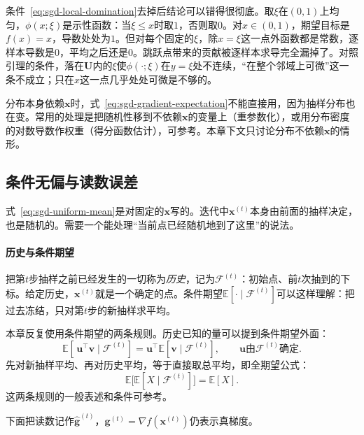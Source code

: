 条件~\eqref{eq:sgd-local-domination}去掉后结论可以错得很彻底。取$\xi$在$(0,1)$上均匀，$\phi(x;\xi)$是示性函数：当$\xi\leq x$时取$1$，否则取$0$。对$x\in(0,1)$，期望目标是$f(x)=x$，导数处处为$1$。但对每个固定的$\xi$，除$x=\xi$这一点外函数都是常数，逐样本导数是$0$，平均之后还是$0$。跳跃点带来的贡献被逐样本求导完全漏掉了。对照引理的条件，落在$\bm{U}$内的$\xi$使$\phi(\cdot;\xi)$在$y=\xi$处不连续，“在整个邻域上可微”这一条不成立；只在$x$这一点几乎处处可微是不够的。

分布本身依赖$\bm{x}$时，式~\eqref{eq:sgd-gradient-expectation}不能直接用，因为抽样分布也在变。常用的处理是把随机性移到不依赖$\bm{x}$的变量上（重参数化），或用分布密度的对数导数作权重（得分函数估计），可参考。本章下文只讨论分布不依赖$\bm{x}$的情形。

\subsection{条件无偏与读数误差}
\label{sec:sgd-unbiased}

式~\eqref{eq:sgd-uniform-mean}是对固定的$\bm{x}$写的。迭代中$\bm{x}^{(t)}$本身由前面的抽样决定，也是随机的。需要一个能处理“当前点已经随机地到了这里”的说法。

\paragraph{历史与条件期望}
把第$t$步抽样之前已经发生的一切称为\emph{历史}，记为$\mathcal{F}^{(t)}$：初始点、前$t$次抽到的下标。给定历史，$\bm{x}^{(t)}$就是一个确定的点。条件期望$\mathbb{E}[\cdot\mid\mathcal{F}^{(t)}]$可以这样理解：把过去冻结，只对第$t$步的新抽样求平均。

本章反复使用条件期望的两条规则。历史已知的量可以提到条件期望外面：
\begin{equation}
 \mathbb{E}[\,\bm{u}^\top\bm{v}\mid\mathcal{F}^{(t)}]=\bm{u}^\top\mathbb{E}[\bm{v}\mid\mathcal{F}^{(t)}],\qquad \bm{u}\text{由}\mathcal{F}^{(t)}\text{确定}.
 \label{eq:sgd-pull-out}
\end{equation}
先对新抽样平均、再对历史平均，等于直接取总平均，即全期望公式：
\begin{equation}
 \mathbb{E}\bigl[\mathbb{E}[X\mid\mathcal{F}^{(t)}]\bigr]=\mathbb{E}[X].
 \label{eq:sgd-tower}
\end{equation}
这两条规则的一般表述和条件可参考。

下面把读数记作$\hat{\bm{g}}^{(t)}$，$\bm{g}^{(t)}=\nabla f(\bm{x}^{(t)})$仍表示真梯度。


